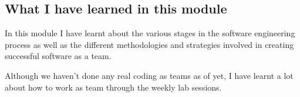 \subsection{What I have learned in this module}
In this module I have learnt about the various stages in the software engineering process as well as the different methodologies and strategies involved in creating successful software as a team.

Although we haven't done any real coding as teams as of yet, I have learnt a lot about how to work as team through the weekly lab sessions.


